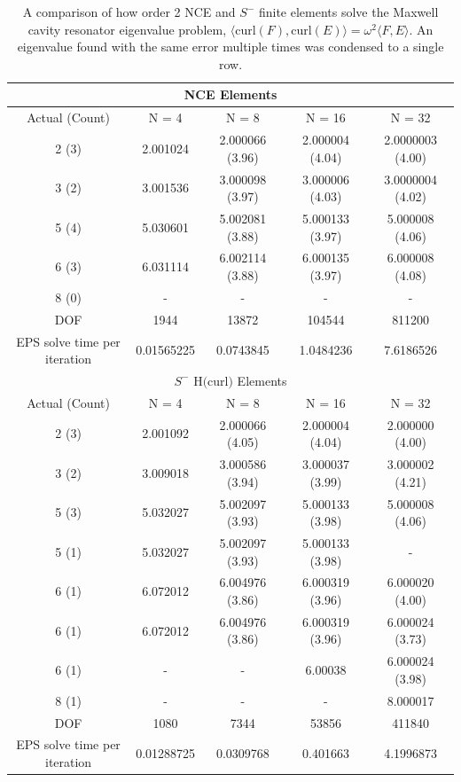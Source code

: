 \documentclass[manuscript,screen]{acmart}
\begin{document}
\begin{center}
\begin{table}
\begin{tabular}{ c c c c c }
\multicolumn{5}{c}{NCE Elements} \\
\hline
Actual (Count) & N = 4 & N = 8 & N = 16 & N = 32 \\ 
\hline
2 (3) &2.001024 & 2.000066 (3.96) & 2.000004 (4.04) & 2.0000003 (4.00) \\  
3 (2) & 3.001536 & 3.000098 (3.97) & 3.000006 (4.03) & 3.0000004 (4.02) \\
5 (4) & 5.030601 & 5.002081 (3.88)& 5.000133 (3.97) & 5.000008 (4.06) \\
6 (3) & 6.031114 & 6.002114 (3.88) & 6.000135 (3.97) &  6.000008 (4.08) \\
8 (0) & - & -& - & - \\
\hline
DOF  & 1944 & 13872 & 104544 & 811200 \\
\hline
EPS solve time per iteration & 0.01565225 & 0.0743845 & 1.0484236 & 7.6186526 \\
\hline
\multicolumn{5}{c}{$S^-$ H$($curl$)$ Elements} \\
\hline
Actual (Count) & N = 4 & N = 8 & N = 16 & N = 32 \\ 
\hline
2 (3) & 2.001092 & 2.000066 (4.05) & 2.000004 (4.04) & 2.000000 (4.00) \\  
3 (2) & 3.009018 & 3.000586 (3.94) & 3.000037 (3.99) & 3.000002 (4.21) \\
5 (3) & 5.032027 & 5.002097 (3.93)& 5.000133 (3.98) & 5.000008 (4.06) \\
5 (1) & 5.032027 & 5.002097 (3.93) & 5.000133 (3.98) & - \\
6 (1) & 6.072012 & 6.004976 (3.86) & 6.000319 (3.96) & 6.000020 (4.00) \\
6 (1) & 6.072012 & 6.004976 (3.86) & 6.000319 (3.96) & 6.000024 (3.73)\\
6 (1) & - & - & 6.00038 & 6.000024 (3.98)\\
8 (1) & - & - & - & 8.000017 \\
\hline
DOF  & 1080 & 7344 & 53856 & 411840 \\
\hline
EPS solve time per iteration & 0.01288725 & 0.0309768 & 0.401663 & 4.1996873 \\
\hline

\end{tabular}
\caption{A comparison of how order 2 NCE and $S^-$ finite elements solve the Maxwell cavity resonator eigenvalue problem, $\langle \text{curl}(F), \text{curl}(E) \rangle = \omega^2 \langle F, E \rangle$. An eigenvalue found with the same error multiple times was condensed to a single row.}  
\label{tab:Eigenvalue}
\end{table}
\end{center}
\end{document}

